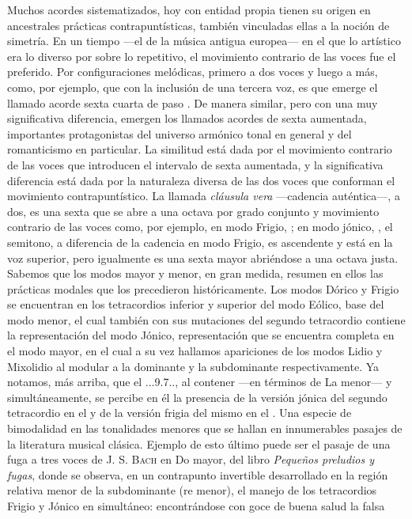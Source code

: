 \documentclass[a4paper,10pt]{article}
\begin{document}
\begin{multicols}{2}
Muchos acordes sistematizados, hoy con entidad propia tienen su origen en ancestrales prácticas contrapuntísticas, también vinculadas ellas a la noción de simetría. En un tiempo ---el de la música antigua europea--- en el que lo artístico era lo diverso por sobre lo repetitivo, el movimiento contrario de las voces fue el preferido. Por configuraciones melódicas, primero a dos voces y luego a más, como, por ejemplo,  que con la inclusión de una tercera voz, es que emerge el llamado acorde sexta cuarta de paso \hbox{.} De manera similar, pero con una muy significativa diferencia, emergen los llamados acordes de sexta aumentada, importantes protagonistas del universo armónico tonal en general y del romanticismo en particular. La similitud está dada por el movimiento contrario de las voces que introducen el intervalo de sexta aumentada, y la significativa diferencia está dada por la naturaleza diversa de las dos voces que conforman el movimiento contrapuntístico. La llamada \emph{cláusula vera} ---cadencia auténtica---, a dos, es una sexta que se abre a una octava por grado conjunto y movimiento contrario de las voces como, por ejemplo, en modo Frigio, \hbox{;} en modo jónico, \hbox{,} el semitono, a diferencia de la cadencia en modo Frigio, es ascendente y está en la voz superior, pero igualmente es una sexta mayor abriéndose a una octava justa. Sabemos que los modos mayor y menor, en gran medida, resumen en ellos las prácticas modales que los precedieron históricamente. Los modos Dórico y Frigio se encuentran en los tetracordios inferior y superior del modo Eólico, base del modo menor, el cual también con sus mutaciones del segundo tetracordio contiene la representación del modo Jónico, representación que se encuentra completa en el modo mayor, en el cual a su vez hallamos apariciones de los modos Lidio y Mixolidio al modular a la dominante y la subdominante respectivamente. Ya notamos, más arriba, que el \acorde.\Dohne..9\bemoltxt.7.., al contener ---en términos de La menor---  y  simultáneamente, se percibe en él la presencia de la versión jónica del segundo tetracordio en el  y de la versión frigia del mismo en el . Una especie de bimodalidad en las tonalidades menores que se hallan en innumerables pasajes de la literatura musical clásica. Ejemplo de esto último puede ser el pasaje de una fuga a tres voces de \textsc{J. S. Bach} en Do mayor, del libro \emph{Pequeños preludios y fugas}, donde se observa, en un contrapunto invertible desarrollado en la región relativa menor de la subdominante (re menor), el manejo de los tetracordios Frigio y Jónico en simultáneo:  encontrándose con goce de buena salud la falsa 
\end{multicols}
\end{document}
